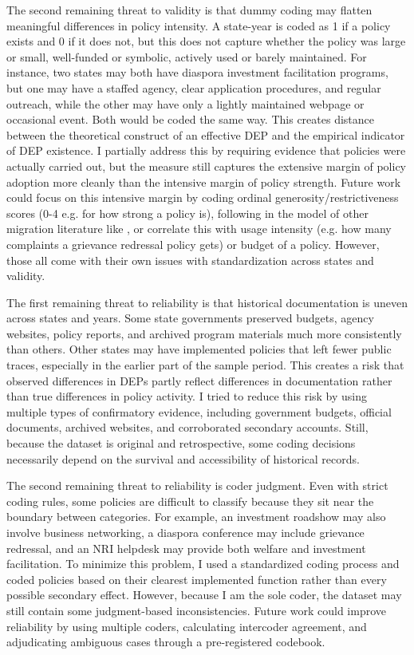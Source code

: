 \documentclass[doublespace,nopageskip]{UVAthesis}
\begin{document}
The second remaining threat to validity is that dummy coding may flatten meaningful differences in policy intensity. A state-year is coded as 1 if a policy exists and 0 if it does not, but this does not capture whether the policy was large or small, well-funded or symbolic, actively used or barely maintained. For instance, two states may both have diaspora investment facilitation programs, but one may have a staffed agency, clear application procedures, and regular outreach, while the other may have only a lightly maintained webpage or occasional event. Both would be coded the same way. This creates distance between the theoretical construct of an effective DEP and the empirical indicator of DEP existence. I partially address this by requiring evidence that policies were actually carried out, but the measure still captures the extensive margin of policy adoption more cleanly than the intensive margin of policy strength. Future work could focus on this intensive margin by coding ordinal generosity/restrictiveness scores (0-4 e.g. for how strong a policy is), following in the model of other migration literature like \citet{scipioni_migration_2018}, or correlate this with usage intensity (e.g. how many complaints a grievance redressal policy gets) or budget of a policy. However, those all come with their own issues with standardization across states and validity.

The first remaining threat to reliability is that historical documentation is uneven across states and years. Some state governments preserved budgets, agency websites, policy reports, and archived program materials much more consistently than others. Other states may have implemented policies that left fewer public traces, especially in the earlier part of the sample period. This creates a risk that observed differences in DEPs partly reflect differences in documentation rather than true differences in policy activity. I tried to reduce this risk by using multiple types of confirmatory evidence, including government budgets, official documents, archived websites, and corroborated secondary accounts. Still, because the dataset is original and retrospective, some coding decisions necessarily depend on the survival and accessibility of historical records.

The second remaining threat to reliability is coder judgment. Even with strict coding rules, some policies are difficult to classify because they sit near the boundary between categories. For example, an investment roadshow may also involve business networking, a diaspora conference may include grievance redressal, and an NRI helpdesk may provide both welfare and investment facilitation. To minimize this problem, I used a standardized coding process and coded policies based on their clearest implemented function rather than every possible secondary effect. However, because I am the sole coder, the dataset may still contain some judgment-based inconsistencies. Future work could improve reliability by using multiple coders, calculating intercoder agreement, and adjudicating ambiguous cases through a pre-registered codebook.
\end{document}
